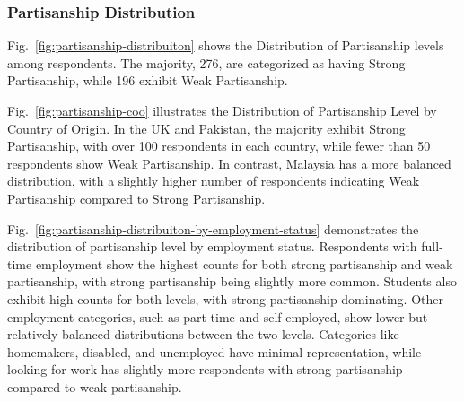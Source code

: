 \documentclass[pt]{article}  %
\begin{document}
\subsubsection{Partisanship Distribution}

Fig.~\ref{fig:partisanship-distribuiton} shows the Distribution of Partisanship levels among respondents. The majority, 276, are categorized as having Strong Partisanship, while 196 exhibit Weak Partisanship.

Fig.~\ref{fig:partisanship-coo} illustrates the Distribution of Partisanship Level by Country of Origin. In the UK and Pakistan, the majority exhibit Strong Partisanship, with over 100 respondents in each country, while fewer than 50 respondents show Weak Partisanship. In contrast, Malaysia has a more balanced distribution, with a slightly higher number of respondents indicating Weak Partisanship compared to Strong Partisanship.

Fig.~\ref{fig:partisanship-distribuiton-by-employment-status} demonstrates the distribution of partisanship level by employment status. Respondents with full-time employment show the highest counts for both strong partisanship and weak partisanship, with strong partisanship being slightly more common. Students also exhibit high counts for both levels, with strong partisanship dominating. Other employment categories, such as part-time and self-employed, show lower but relatively balanced distributions between the two levels. Categories like homemakers, disabled, and unemployed have minimal representation, while looking for work has slightly more respondents with strong partisanship compared to weak partisanship.
\end{document}

